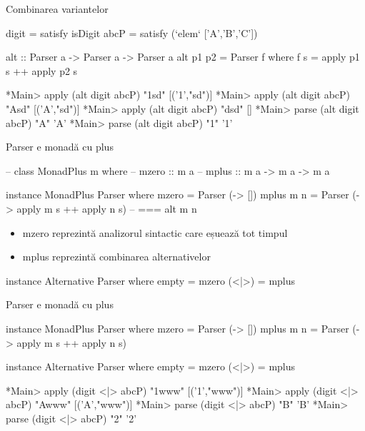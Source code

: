 \documentclass[xcolor=x11names,compress,10pt]{beamer}
\begin{document}
\begin{frame}[fragile]{Combinarea variantelor}
\begin{asciihs}

digit = satisfy isDigit
abcP = satisfy (`elem` ['A','B','C'])

alt :: Parser a -> Parser a -> Parser a
alt p1 p2 = Parser f
          where f s = apply p1 s ++ apply p2 s 
\end{asciihs}

\pause 
\begin{asciihs}
*Main> apply (alt digit abcP) "1sd"
[('1',"sd")]
*Main> apply (alt digit abcP) "Asd"
[('A',"sd")]
*Main> apply (alt digit abcP) "dsd"
[] 
*Main> parse (alt digit abcP) "A"
'A'
*Main> parse (alt digit abcP) "1"
'1'
\end{asciihs}
\end{frame}

\begin{frame}[fragile]{ Parser e monadă cu plus}
\begin{asciihs}
  --   class MonadPlus m where
  --     mzero :: m a
  --     mplus :: m a -> m a -> m a

  instance MonadPlus Parser where
    mzero      = Parser (\s -> [])
    mplus m n  = Parser (\s -> apply m s ++ apply n s)
               -- === alt m n
\end{asciihs}

\begin{itemize}
\item mzero reprezintă analizorul sintactic care eșuează tot timpul
\item mplus reprezintă combinarea alternativelor
\end{itemize}


\begin{asciihs}
instance Alternative Parser where
  empty  = mzero
  (<|>) = mplus  
\end{asciihs}
\end{frame}


\begin{frame}[fragile]{ Parser e monadă cu plus}
\begin{asciihs}
instance MonadPlus Parser where
    mzero      = Parser (\s -> [])
    mplus m n  = Parser (\s -> apply m s ++ apply n s)

instance Alternative Parser where
  empty  = mzero
  (<|>) = mplus  
\end{asciihs}

\begin{asciihs}
*Main> apply (digit <|> abcP) "1www"
[('1',"www")]
*Main> apply (digit <|> abcP) "Awww"
[('A',"www")]
*Main> parse (digit <|> abcP) "B"
'B'
*Main> parse (digit <|> abcP) "2"
'2'
\end{asciihs}
\end{frame}
\end{document}
